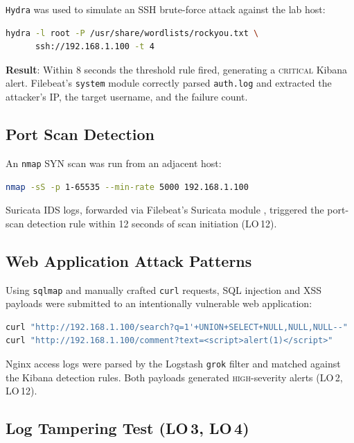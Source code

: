 \documentclass[12pt,a4paper]{report}
\begin{document}
\texttt{Hydra} was used to simulate an SSH brute-force attack against the lab host:

\begin{lstlisting}[language=bash, caption={SSH brute-force simulation with Hydra}]
hydra -l root -P /usr/share/wordlists/rockyou.txt \
      ssh://192.168.1.100 -t 4
\end{lstlisting}

\textbf{Result}: Within 8 seconds the threshold rule fired, generating a
\textsc{critical} Kibana alert.
Filebeat's \texttt{system} module correctly parsed \texttt{auth.log} and extracted
the attacker's IP, the target username, and the failure count.

\subsection{Port Scan Detection}

An \texttt{nmap} SYN scan was run from an adjacent host:

\begin{lstlisting}[language=bash, caption={Port scan simulation with nmap}]
nmap -sS -p 1-65535 --min-rate 5000 192.168.1.100
\end{lstlisting}

Suricata IDS logs, forwarded via Filebeat's Suricata module \cite{suricata}, triggered the
port-scan detection rule within 12 seconds of scan initiation (LO\,12).

\subsection{Web Application Attack Patterns}

Using \texttt{sqlmap} and manually crafted \texttt{curl} requests, SQL injection
and XSS payloads were submitted to an intentionally vulnerable web application:

\begin{lstlisting}[language=bash, caption={SQL injection test request}]
curl "http://192.168.1.100/search?q=1'+UNION+SELECT+NULL,NULL,NULL--"
curl "http://192.168.1.100/comment?text=<script>alert(1)</script>"
\end{lstlisting}

Nginx access logs were parsed by the Logstash \texttt{grok} filter and matched
against the Kibana detection rules.
Both payloads generated \textsc{high}-severity alerts (LO\,2, LO\,12).

\subsection{Log Tampering Test (LO\,3, LO\,4)}
\end{document}
